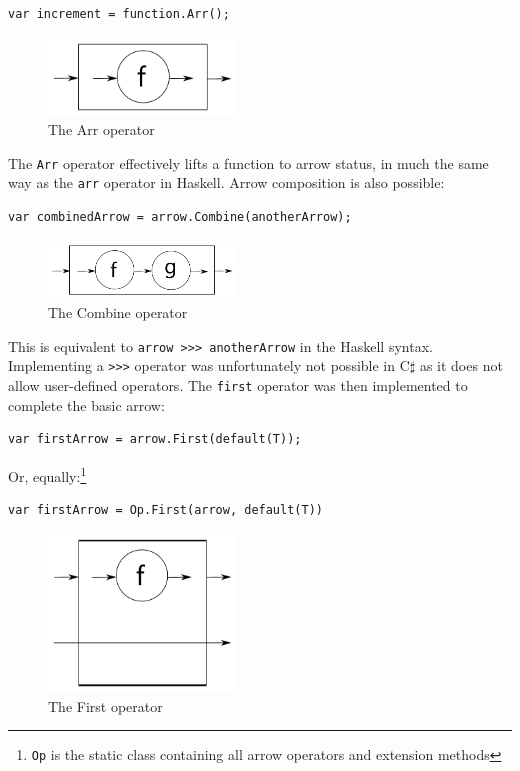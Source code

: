 \documentclass[12pt,twoside,notitlepage]{report}
\begin{document}
\begin{lstlisting}[language={[Sharp]C}]
var increment = function.Arr();
\end{lstlisting}

\begin{figure}[!ht]
  \centering
  \includegraphics[width=50mm]{fig/ArrOperator.pdf}
  \caption{The Arr operator}
  \label{fig:arr_operator}
\end{figure}

The \texttt{Arr} operator effectively lifts a function to arrow status, in much the same way as the \texttt{arr} operator in Haskell. Arrow composition is also possible:

\begin{lstlisting}[language={[Sharp]C}]
var combinedArrow = arrow.Combine(anotherArrow);
\end{lstlisting}

\begin{figure}[!ht]
  \centering
  \includegraphics[width=50mm]{fig/CompositionOperator.pdf}
  \caption{The Combine operator}
  \label{fig:combine_operator}
\end{figure}

This is equivalent to \texttt{arrow >>> anotherArrow} in the Haskell syntax. Implementing a \texttt{>>>} operator was unfortunately not possible in C$\sharp$ as it does not allow user-defined operators. The \texttt{first} operator was then implemented to complete the basic arrow:

\begin{lstlisting}[language={[Sharp]C}]
var firstArrow = arrow.First(default(T));
\end{lstlisting}

Or, equally:\footnote{\texttt{Op} is the static class containing all arrow operators and extension methods}

\begin{lstlisting}[language={[Sharp]C}]
var firstArrow = Op.First(arrow, default(T))
\end{lstlisting}

\begin{figure}[!ht]
  \centering
  \includegraphics[width=50mm]{fig/FirstOperator.pdf}
  \caption{The First operator}
  \label{fig:first_operator}
\end{figure}
\end{document}
